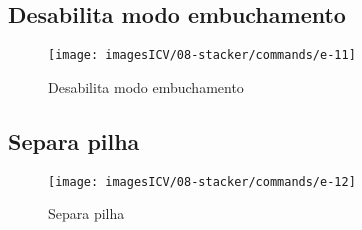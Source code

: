 \thispagestyle{fancy}
\vspace{\fill}
\subsection{\small Desabilita modo embuchamento}
\begin{figure}
    \centering
    \texttt{[image: imagesICV/08-stacker/commands/e-11]}
    \caption{Desabilita modo embuchamento}
\end{figure}
\newpage

\thispagestyle{fancy}
\vspace{\fill}
\subsection{\small Separa pilha}
\begin{figure}
    \centering
    \texttt{[image: imagesICV/08-stacker/commands/e-12]}
    \caption{Separa pilha}
\end{figure}

